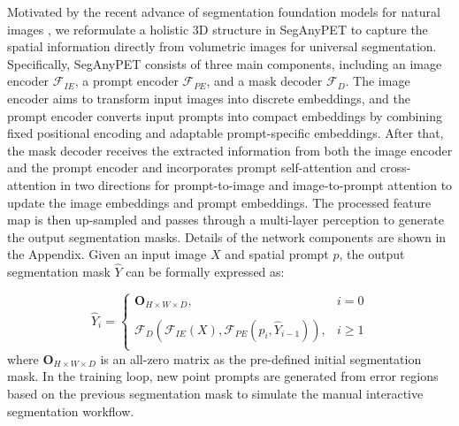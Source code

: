 Motivated by the recent advance of segmentation foundation models for natural images \cite{SAM}, we reformulate a holistic 3D structure in SegAnyPET to capture the spatial information directly from volumetric images for universal segmentation.
Specifically, SegAnyPET consists of three main components, including an image encoder $\mathcal{F}_{IE}$, a prompt encoder $\mathcal{F}_{PE}$, and a mask decoder $\mathcal{F}_{D}$.
The image encoder aims to transform input images into discrete embeddings, and the prompt encoder converts input prompts into compact embeddings by combining fixed positional encoding and adaptable prompt-specific embeddings. After that, the mask decoder receives the extracted information from both the image encoder and the prompt encoder and incorporates prompt self-attention and cross-attention in two directions for prompt-to-image and image-to-prompt attention to update the image embeddings and prompt embeddings. The processed feature map is then up-sampled and passes through a multi-layer perception to generate the output segmentation masks. 
Details of the network components are shown in the Appendix.
Given an input image $X$ and spatial prompt $p$, the output segmentation mask $\hat Y$ can be formally expressed as:

\begin{equation}
\hat Y_{i} = \left\{
\begin{array}{lllll}
\mathbf{O}_{H \times W \times D}, & i=0 \\ \\
\mathcal{F}_{D}(\mathcal{F}_{IE}(X), \mathcal{F}_{PE}(p_{i},\hat Y_{i-1})), & i \ge 1 \\
\end{array}\right.
\end{equation} 
where $\mathbf{O}_{H \times W \times D}$ is an all-zero matrix as the pre-defined initial segmentation mask. In the training loop, new point prompts are generated from error regions based on the previous segmentation mask to simulate the manual interactive segmentation workflow.


